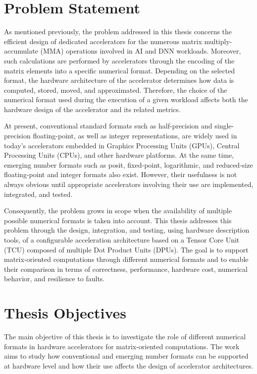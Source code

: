 \section{Problem Statement}

As mentioned previously, the problem addressed in this thesis concerns the
efficient design of dedicated accelerators for the numerous matrix
multiply-accumulate (MMA) operations involved in AI and DNN workloads.
Moreover, such calculations are performed by accelerators through the encoding
of the matrix elements into a specific numerical format. Depending on the
selected format, the hardware architecture of the accelerator determines how
data is computed, stored, moved, and approximated. Therefore, the choice of
the numerical format used during the execution of a given workload affects
both the hardware design of the accelerator and its related metrics.

At present, conventional standard formats such as half-precision and
single-precision floating-point, as well as integer representations, are
widely used in today's accelerators embedded in Graphics Processing Units
(GPUs), Central Processing Units (CPUs), and other hardware platforms. At the
same time, emerging number formats such as posit, fixed-point, logarithmic,
and reduced-size floating-point and integer formats also exist. However, their
usefulness is not always obvious until appropriate accelerators involving
their use are implemented, integrated, and tested.

Consequently, the problem grows in scope when the availability of multiple
possible numerical formats is taken into account. This thesis addresses this
problem through the design, integration, and testing, using hardware
description tools, of a configurable acceleration architecture based on a
Tensor Core Unit (TCU) composed of multiple Dot Product Units (DPUs). The goal
is to support matrix-oriented computations through different numerical formats
and to enable their comparison in terms of correctness, performance, hardware
cost, numerical behavior, and resilience to faults.

\section{Thesis Objectives}

The main objective of this thesis is to investigate the role of different
numerical formats in hardware accelerators for matrix-oriented computations.
The work aims to study how conventional and emerging number formats can be
supported at hardware level and how their use affects the design of
accelerator architectures.


